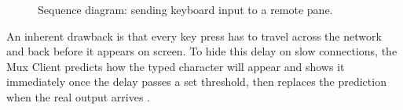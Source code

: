 \begin{figure}[!htbp]
  \centering
  \caption{Sequence diagram: sending keyboard input to a remote pane.}
  \label{fig:ssh-input}
\end{figure}

An inherent drawback is that every key press has to travel across the network and back before it appears on screen. To hide this delay on slow connections, the Mux Client predicts how the typed character will appear and shows it immediately once the delay passes a set threshold, then replaces the prediction when the real output arrives \cite{sshdomain}.